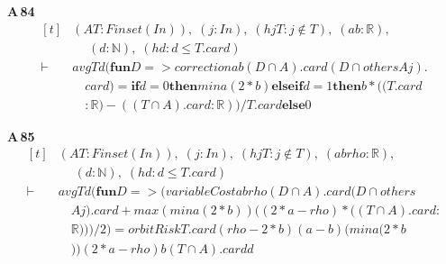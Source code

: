 \noindent\textbf{A\,84}\quad{}
{\footnotesize\[ \begin{aligned}[t]
&(\mathit{A} \mathit{T} : \mathit{Finset} (\mathit{I} \mathit{n})),\; (\mathit{j} : \mathit{I} \mathit{n}),\; (\mathit{hjT} : \mathit{j} \notin \mathit{T}),\; (\mathit{a} \mathit{b} : \mathbb{R} ),\\
&\quad \; (\mathit{d} : \mathbb{N} ),\; (\mathit{hd} : \mathit{d} \leq \mathit{T}.\mathit{card})\\
\vdash\;&\mathit{avg} \mathit{T} \mathit{d} (\mathbf{fun} \mathit{D} => \mathit{correction} \mathit{a} \mathit{b} (\mathit{D} \cap \mathit{A}).\mathit{card} (\mathit{D} \cap \mathit{others} \mathit{A} \mathit{j}).\\
&\quad \mathit{card}) = \mathbf{if} \mathit{d}=0 \mathbf{then} \mathit{min} \mathit{a} (2*\mathit{b}) \mathbf{else} \mathbf{if} \mathit{d}=1 \mathbf{then} \mathit{b}*((\mathit{T}.\mathit{card}\\
&\quad :\mathbb{R} )-((\mathit{T} \cap \mathit{A}).\mathit{card}:\mathbb{R} ))/\mathit{T}.\mathit{card} \mathbf{else} 0
\end{aligned} \]}

\noindent\textbf{A\,85}\quad{}
{\footnotesize\[ \begin{aligned}[t]
&(\mathit{A} \mathit{T} : \mathit{Finset} (\mathit{I} \mathit{n})),\; (\mathit{j} : \mathit{I} \mathit{n}),\; (\mathit{hjT} : \mathit{j} \notin \mathit{T}),\; (\mathit{a} \mathit{b} \mathit{rho} : \mathbb{R} ),\\
&\quad \; (\mathit{d} : \mathbb{N} ),\; (\mathit{hd} : \mathit{d} \leq \mathit{T}.\mathit{card})\\
\vdash\;&\mathit{avg} \mathit{T} \mathit{d} (\mathbf{fun} \mathit{D} => (\mathit{variableCost} \mathit{a} \mathit{b} \mathit{rho} (\mathit{D} \cap \mathit{A}).\mathit{card} (\mathit{D} \cap \mathit{others}\\
&\quad \mathit{A} \mathit{j}).\mathit{card}+ \mathit{max} (\mathit{min} \mathit{a} (2*\mathit{b})) ((2*\mathit{a}-\mathit{rho})*((\mathit{T} \cap \mathit{A}).\mathit{card}:\\
&\quad \mathbb{R} )))/2) = \mathit{orbitRisk} \mathit{T}.\mathit{card} (\mathit{rho}-2*\mathit{b}) (\mathit{a}-\mathit{b}) (\mathit{min} \mathit{a} (2*\mathit{b}\\
&\quad )) (2*\mathit{a}-\mathit{rho}) \mathit{b} (\mathit{T} \cap \mathit{A}).\mathit{card} \mathit{d}
\end{aligned} \]}

